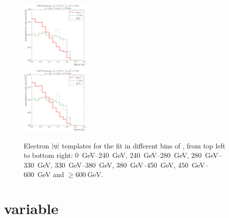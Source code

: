 \begin{figure}[!htbp]
  	{\includegraphics[width=0.3\textwidth]{measurement/HT/central/fit_templates/muon_templates_bin_450-600}}\\
  	{\includegraphics[width=0.3\textwidth]{measurement/HT/central/fit_templates/muon_templates_bin_600-inf}}
    \caption{Electron $\lvert \eta \rvert$ templates for the fit in different bins of \HT,
    from top left to bottom right: \SIrange{0}{240}{\GeV}, \SIrange{240}{280}{\GeV},
    \SIrange{280}{330}{\GeV}, \SIrange{330}{380}{\GeV}, \SIrange{380}{450}{\GeV},
    \SIrange{450}{600}{\GeV} and $\geq \SI{600}{\GeV}$.}
    \label{fig:fit_templates_HT_muon}
\end{figure}

\newpage
\section*{\ST variable}

